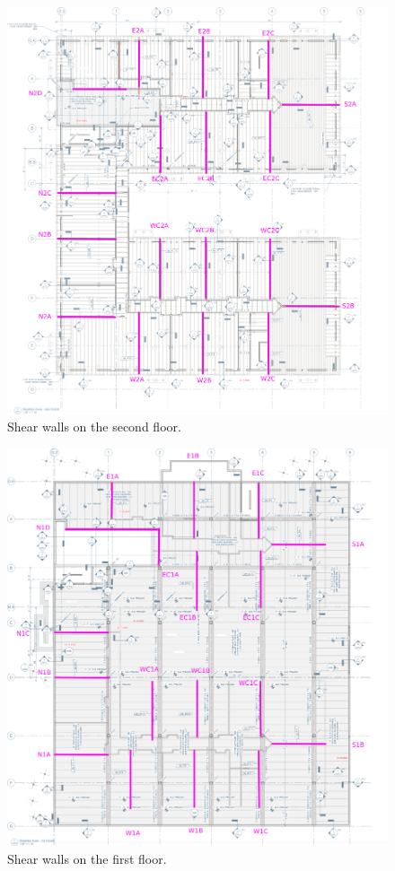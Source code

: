 \begin{figure}
  \begin{center}
  \includegraphics[width=120mm]{figures/walls/2nd_floor_key_plan}
  \end{center}
  \caption{Shear walls on the second floor.}\label{fg_2nd_floor_key_plan}
\end{figure}


\begin{figure}
  \begin{center}
  \includegraphics[width=120mm]{figures/walls/1st_floor_key_plan}
  \end{center}
  \caption{Shear walls on the first floor.}\label{fg_1st_floor_key_plan}
\end{figure}
